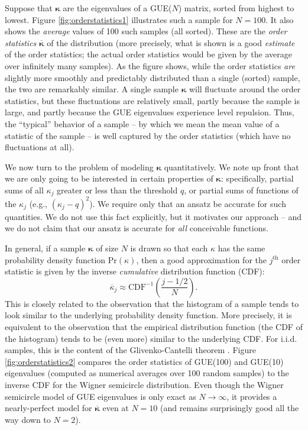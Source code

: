 \documentclass[aps,pra, twocolumn]{revtex4-1}
\newcommand{\bvec}[1]{\boldsymbol{#1}}
\begin{document}
Suppose that $\bvec{\kappa}$ are the eigenvalues of a GUE($N$) matrix, sorted from highest to lowest.  Figure \ref{fig:orderstatistics1} illustrates such a sample for $N=100$.  It also shows the \emph{average} values of 100 such samples (all sorted).  These are the \emph{order statistics} $\overline{\bvec{\kappa}}$ of the distribution (more precisely, what is shown is a good \emph{estimate} of the order statistics; the actual order statistics would be given by the average over infinitely many samples).  As the figure shows, while the order statistics \emph{are} slightly more smoothly and predictably distributed than a single (sorted) sample, the two are remarkably similar.  A single sample $\bvec{\kappa}$ will fluctuate around the order statistics, but these fluctuations are relatively small, partly because the sample is large, and partly because the GUE eigenvalues experience level repulsion.  Thus, the ``typical'' behavior of a sample -- by which we mean the mean value of a statistic of the sample -- is well captured by the order statistics (which have no fluctuations at all).

We now turn to the problem of modeling $\bvec{\kappa}$ quantitatively.  We note up front that we are only going to be interested in certain properties of $\bvec{\kappa}$:  specifically, partial sums of all $\kappa_j$ greater or less than the threshold $q$, or partial sums of functions of the $\kappa_j$ (e.g., $(\kappa_j-q)^2$).  We require only that an ansatz be accurate for such quantities.  We do not use this fact explicitly, but it motivates our approach -- and we do not claim that our ansatz is accurate for \emph{all} conceivable functions.

In general, if a sample $\bvec{\kappa}$ of size $N$ is drawn so that each $\kappa$ has the same probability density 
function $\mathrm{Pr}(\kappa)$, then a good approximation for the $j^{\mathrm{th}}$ order statistic is given by the inverse 
\emph{cumulative} distribution function (CDF):
\begin{equation}
\overline{\kappa}_j \approx \mathrm{CDF}^{-1}\left(\frac{j-1/2}{N}\right).
\end{equation}
This is closely related to the observation that the histogram of a sample tends to look similar to the underlying probability density function.  More precisely, it is equivalent to the observation that the empirical distribution function (the CDF of the histogram) tends to be (even more) similar to the underlying CDF.  For i.i.d. samples, this is the content of the Glivenko-Cantelli theorem \cite{VanderVaart2000}.  Figure \ref{fig:orderstatistics2} compares the order statistics of GUE(100) and GUE(10) eigenvalues (computed as numerical averages over 100 random samples) to the inverse CDF for the Wigner semicircle distribution.  Even though the Wigner semicircle model of GUE eigenvalues is only exact as $N\to\infty$, it provides a nearly-perfect model for $\overline{\bvec{\kappa}}$ even at $N=10$ (and remains surprisingly good all the way down to $N=2$).
\end{document}
